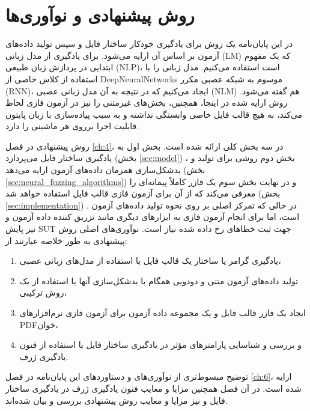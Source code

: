 \section{روش پیشنهادی و نوآوری‌ها}
در این پایان‌نامه یک روش برای یادگیری خودکار ساختار فایل و سپس تولید داده‌های آزمون بر اساس آن ارایه می‌شود. برای یادگیری از مدل زبانی (\gls{LM})
 که یک مفهوم ابتدایی در پردازش زبان طبیعی (\gls{NLP})،
است استفاده می‌کنیم. مدل زبانی را با استفاده از کلاس خاصی از 
\glspl{DeepNeuralNetwork}
موسوم به شبکه‌ عصبی مکرر (\gls{RNN})، ایجاد می‌کنیم که در نتیجه به آن مدل زبانی عصبی (\gls{NLM}) هم گفته می‌شود. روش ارایه  شده در اینجا، همچنین، بخش‌های غیرمتنی را نیز در آزمون فازی لحاظ می‌کند، به هیچ قالب فایل خاصی وابستگی نداشته و به سبب پیاده‌سازی با زبان پایتون قابلیت اجرا برروی هر ماشینی را دارد. 

روش پیشنهادی در فصل 
\ref{ch:4}،
در سه بخش کلی ارائه شده است. بخش اول به یادگیری ساختار فایل می‌پردازد
(بخش \ref{sec:model})
، بخش دوم روشی برای تولید و بدشکل‌سازی همزمان داده‌های آزمون ارایه می‌دهد 
(بخش \ref{sec:neural_fuzzing_algorithms})
و در نهایت بخش سوم یک فازر کاملاً پیمانه‌ای را معرفی می‌کند که از آن برای آزمون فازی قالب فایل استفاده خواهد شد
(بخش \ref{sec:implementation})
. در حالی که تمرکز اصلی بر روی نحوه تولید داده‌های آزمون است، اما برای انجام آزمون فازی به ابزارهای دیگری مانند تزریق کننده داده آزمون و نیز پایش 
\gls{SUT}  
جهت ثبت خطاهای رخ‌ داده شده نیاز است. نوآوری‌های اصلی روش پیشنهادی به طور خلاصه عبارتند از:
\begin{enumerate}
	\item{
	یادگیری گرامر یا ساختار یک قالب فایل با استفاده از مدل‌های زبانی عصبی،	
}

\item{
	تولید داده‌های آزمون متنی و دودویی همگام با بدشکل‌سازی آنها با استفاده از یک روش ترکیبی،
}

\item{
ایجاد یک فازر قالب فایل و یک مجموعه داده آزمون برای آزمون فازی نرم‌افزارهای 
\gls{PDF}خوان،
}

\item{
	و بررسی و شناسایی پارامترهای مؤثر در یادگیری ساختار فایل با استفاده از فنون یادگیری ژرف.
}

\end{enumerate}

توضیح مبسوط‌تری از نوآوری‌های و دستاوردهای این پایان‌نامه در فصل 
\ref{ch:6}، 
ارایه شده است. در آن فصل همچنین مزایا و معایب فنون یادگیری ژرف در یادگیری ساختار فایل و نیز مزایا و معایب روش پیشنهادی بررسی و بیان شده‌اند. 


